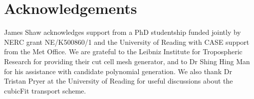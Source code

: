 \documentclass[times]{elsarticle}
\begin{document}






\section{Acknowledgements}
James Shaw acknowledges support from a PhD studentship funded jointly by NERC grant NE/K500860/1 and the University of Reading with CASE support from the Met Office.
We are grateful to the Leibniz Institute for Tropospheric Research for providing their cut cell mesh generator, and to Dr Shing Hing Man for his assistance with candidate polynomial generation.  We also thank Dr Tristan Pryer at the University of Reading for useful discussions about the cubicFit transport scheme.






\end{document}
